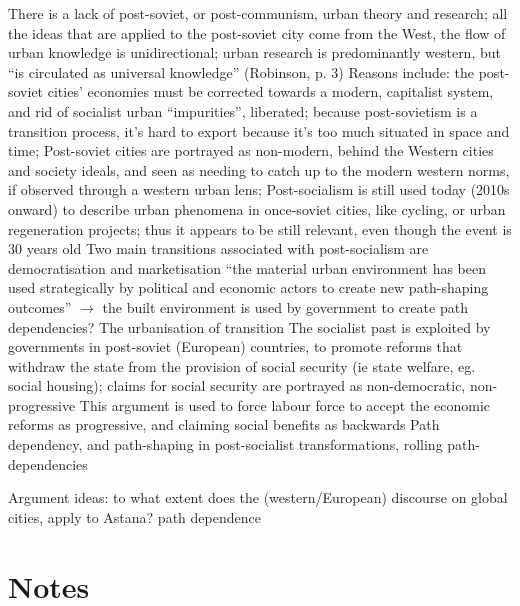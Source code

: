 \documentclass{article}
\begin{document}
\begin{outline}
	\1 There is a lack of post-soviet, or post-communism, urban theory and research; all the ideas that are applied to the post-soviet city come from the West, the flow of urban knowledge is unidirectional; urban research is predominantly western, but ``is circulated as universal knowledge'' (Robinson, p. 3)
	\1 Reasons include: the post-soviet cities' economies must be corrected towards a modern, capitalist system, and rid of socialist urban ``impurities'', liberated; because post-sovietism is a transition process, it's hard to export because it's too much situated in space and time; 
	\1 Post-soviet cities are portrayed as non-modern, behind the Western cities and society ideals, and seen as needing to catch up to the modern western norms, if observed through a western urban lens; 
	\1 Post-socialism is still used today (2010s onward) to describe urban phenomena in once-soviet cities, like cycling, or urban regeneration projects; thus it appears to be still relevant, even though the event is 30 years old
	\1 Two main transitions associated with post-socialism are democratisation and marketisation
	\1 ``the material urban environment has been used strategically by political and economic actors to create new path-shaping outcomes'' $\rightarrow$ the built environment is used by government to create path dependencies? 
	\1 The urbanisation of transition
	\1 The socialist past is exploited by governments in post-soviet (European) countries, to promote reforms that withdraw the state from the provision of social security (ie state welfare, eg. social housing); claims for social security are portrayed as non-democratic, non-progressive
		\2 This argument is used to force labour force to accept the economic reforms as progressive, and claiming social benefits as backwards 
	\1 Path dependency, and path-shaping in post-socialist transformations, rolling path-dependencies
\end{outline}

Argument ideas: to what extent does the (western/European) discourse on global cities, apply to Astana?
path dependence


\section{Notes}
\end{document}
